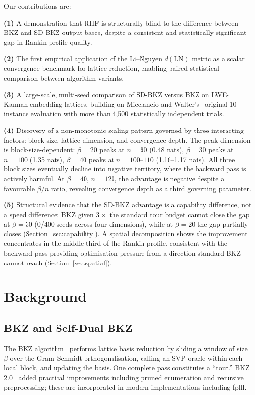 \documentclass[journal=cic,version=preprint]{iacrj}
\begin{document}
Our contributions are:

\textbf{(1)} A demonstration that RHF is structurally blind to the difference between BKZ and SD-BKZ output bases, despite a consistent and statistically significant gap in Rankin profile quality.

\textbf{(2)} The first empirical application of the Li--Nguyen $d(\mathrm{LN})$ metric as a scalar convergence benchmark for lattice reduction, enabling paired statistical comparison between algorithm variants.

\textbf{(3)} A large-scale, multi-seed comparison of SD-BKZ versus BKZ on LWE-Kannan embedding lattices, building on Micciancio and Walter's~\cite{EC:MicWal16} original 10-instance evaluation with more than 4{,}500 statistically independent trials.

\textbf{(4)} Discovery of a non-monotonic scaling pattern governed by three interacting factors: block size, lattice dimension, and convergence depth. The peak dimension is block-size-dependent: $\beta=20$ peaks at $n=90$ (0.48 nats), $\beta=30$ peaks at $n=100$ (1.35 nats), $\beta=40$ peaks at $n=100$--$110$ (1.16--1.17 nats). All three block sizes eventually decline into negative territory, where the backward pass is actively harmful. At $\beta=40$, $n=120$, the advantage is negative despite a favourable $\beta/n$ ratio, revealing convergence depth as a third governing parameter.

\textbf{(5)} Structural evidence that the SD-BKZ advantage is a capability difference, not a speed difference: BKZ given $3\times$ the standard tour budget cannot close the gap at $\beta=30$ (0/400 seeds across four dimensions), while at $\beta=20$ the gap partially closes (Section~\ref{sec:capability}). A spatial decomposition shows the improvement concentrates in the middle third of the Rankin profile, consistent with the backward pass providing optimisation pressure from a direction standard BKZ cannot reach (Section~\ref{sec:spatial}).

\section{Background}
\label{sec:background}

\subsection{BKZ and Self-Dual BKZ}

The BKZ algorithm~\cite{MathProg:SchEuc94} performs lattice basis reduction by sliding a window of size $\beta$ over the Gram--Schmidt orthogonalisation, calling an SVP oracle within each local block, and updating the basis. One complete pass constitutes a ``tour.'' BKZ 2.0~\cite{AC:CheNgu11} added practical improvements including pruned enumeration and recursive preprocessing; these are incorporated in modern implementations including fplll.
\end{document}
